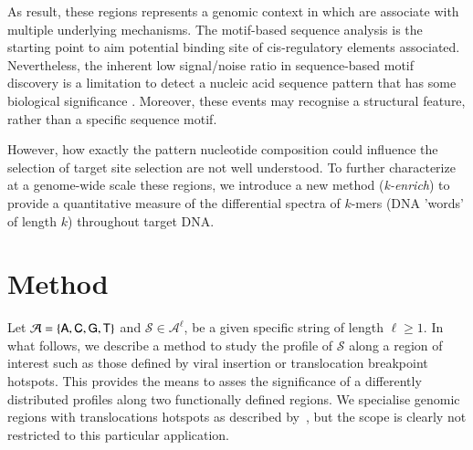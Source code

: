 \documentclass{bioinfo}
\begin{document}
As result, these regions represents a genomic context in which are associate with multiple underlying mechanisms. The motif-based sequence analysis is the starting point to aim potential binding site of cis-regulatory elements associated. Nevertheless, the inherent low signal/noise ratio in sequence-based motif discovery is a limitation to detect a nucleic acid sequence pattern that has some biological significance \cite{pmid16284194}. Moreover, these events may recognise a structural feature, rather than a specific sequence motif. 



However, how exactly the pattern nucleotide composition could
influence the selection of target site selection are not well
understood. To further characterize at a genome-wide scale these
regions, we introduce a new method ({\it k-enrich}) to provide a
quantitative measure of the differential spectra of $k$-mers (DNA
'words' of length $k$) throughout target DNA. 


\section{Method}
Let $\mathcal A = \{\sf A, C, G, T\}$ and $\mathcal S \in \mathcal
A^\ell$, be a given specific string of length $\ell\geq
1$. %
In what follows, we describe a method to study the profile of $\mathcal S$ along a region of interest such as those defined by viral insertion or translocation breakpoint hotspots. This provides the means to asses the significance of a differently distributed profiles along two functionally defined regions. We specialise genomic regions with translocations hotspots as described by~\cite{pmid21962510}, but the scope is clearly not
restricted to this particular application.  
\end{document}
